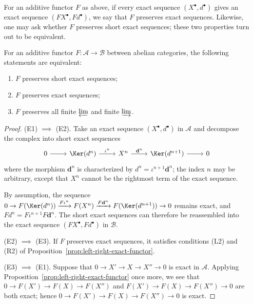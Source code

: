 For an additive functor $F$ as above, if every exact sequence
$(X^\bullet,d^\bullet)$ gives an exact sequence $(FX^\bullet,Fd^\bullet)$, we
say that $F$ preserves exact sequences. Likewise, one may ask whether $F$
preserves short exact sequences; these two properties turn out to be
equivalent.

\begin{proposition}\label{prop:exact-functor}
For an additive functor $F:\mathcal{A}\to\mathcal{B}$ between abelian
categories, the following statements are equivalent:
\begin{enumerate}[(E1)]
	\item $F$ preserves short exact sequences;
	\item $F$ preserves exact sequences;
	\item $F$ preserves all finite $\varprojlim$ and finite $\varinjlim$.
\end{enumerate}
\end{proposition}

\begin{proof}
(E1) $\implies$ (E2). Take an exact sequence $(X^\bullet,d^\bullet)$ in
$\mathcal{A}$ and decompose the complex into short exact sequences
\[\begin{tikzcd}
	0 \arrow[r] & \Ker(d^n) \arrow[r, "{\iota^n}"] & X^n \arrow[r, "{\mathbf{d}^n}"] & \Ker(d^{n+1}) \arrow[r] & 0
\end{tikzcd}\]
where the morphism $\mathbf{d}^n$ is characterized by
$d^n=\iota^{n+1}\mathbf{d}^n$; the index $n$ may be arbitrary, except that
$X^n$ cannot be the rightmost term of the exact sequence.

By assumption, the sequence
$0\to F(\Ker(d^n))\xrightarrow{F\iota^n}F(X^n)
\xrightarrow{F\mathbf{d}^n}F(\Ker(d^{n+1}))\to0$ remains exact, and
$Fd^n=F\iota^{n+1}F\mathbf{d}^n$. The short exact sequences can therefore be
reassembled into the exact sequence $(FX^\bullet,Fd^\bullet)$ in
$\mathcal{B}$.

(E2) $\implies$ (E3). If $F$ preserves exact sequences, it satisfies
conditions (L2) and (R2) of
Proposition~\ref{prop:left-right-exact-functor}.

(E3) $\implies$ (E1). Suppose that
$0\to X'\to X\to X''\to0$ is exact in $\mathcal{A}$. Applying
Proposition~\ref{prop:left-right-exact-functor} once more, we see that
$0\to F(X')\to F(X)\to F(X'')$ and
$F(X')\to F(X)\to F(X'')\to0$ are both exact; hence
$0\to F(X')\to F(X)\to F(X'')\to0$ is exact.
\end{proof}

